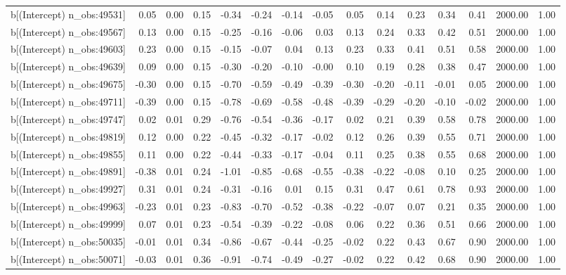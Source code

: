 \begin{table}[ht]
\begin{tabular}{rrrrrrrrrrrrrrr}
  b[(Intercept) n\_obs:49531] & 0.05 & 0.00 & 0.15 & -0.34 & -0.24 & -0.14 & -0.05 & 0.05 & 0.14 & 0.23 & 0.34 & 0.41 & 2000.00 & 1.00 \\ 
  b[(Intercept) n\_obs:49567] & 0.13 & 0.00 & 0.15 & -0.25 & -0.16 & -0.06 & 0.03 & 0.13 & 0.24 & 0.33 & 0.42 & 0.51 & 2000.00 & 1.00 \\ 
  b[(Intercept) n\_obs:49603] & 0.23 & 0.00 & 0.15 & -0.15 & -0.07 & 0.04 & 0.13 & 0.23 & 0.33 & 0.41 & 0.51 & 0.58 & 2000.00 & 1.00 \\ 
  b[(Intercept) n\_obs:49639] & 0.09 & 0.00 & 0.15 & -0.30 & -0.20 & -0.10 & -0.00 & 0.10 & 0.19 & 0.28 & 0.38 & 0.47 & 2000.00 & 1.00 \\ 
  b[(Intercept) n\_obs:49675] & -0.30 & 0.00 & 0.15 & -0.70 & -0.59 & -0.49 & -0.39 & -0.30 & -0.20 & -0.11 & -0.01 & 0.05 & 2000.00 & 1.00 \\ 
  b[(Intercept) n\_obs:49711] & -0.39 & 0.00 & 0.15 & -0.78 & -0.69 & -0.58 & -0.48 & -0.39 & -0.29 & -0.20 & -0.10 & -0.02 & 2000.00 & 1.00 \\ 
  b[(Intercept) n\_obs:49747] & 0.02 & 0.01 & 0.29 & -0.76 & -0.54 & -0.36 & -0.17 & 0.02 & 0.21 & 0.39 & 0.58 & 0.78 & 2000.00 & 1.00 \\ 
  b[(Intercept) n\_obs:49819] & 0.12 & 0.00 & 0.22 & -0.45 & -0.32 & -0.17 & -0.02 & 0.12 & 0.26 & 0.39 & 0.55 & 0.71 & 2000.00 & 1.00 \\ 
  b[(Intercept) n\_obs:49855] & 0.11 & 0.00 & 0.22 & -0.44 & -0.33 & -0.17 & -0.04 & 0.11 & 0.25 & 0.38 & 0.55 & 0.68 & 2000.00 & 1.00 \\ 
  b[(Intercept) n\_obs:49891] & -0.38 & 0.01 & 0.24 & -1.01 & -0.85 & -0.68 & -0.55 & -0.38 & -0.22 & -0.08 & 0.10 & 0.25 & 2000.00 & 1.00 \\ 
  b[(Intercept) n\_obs:49927] & 0.31 & 0.01 & 0.24 & -0.31 & -0.16 & 0.01 & 0.15 & 0.31 & 0.47 & 0.61 & 0.78 & 0.93 & 2000.00 & 1.00 \\ 
  b[(Intercept) n\_obs:49963] & -0.23 & 0.01 & 0.23 & -0.83 & -0.70 & -0.52 & -0.38 & -0.22 & -0.07 & 0.07 & 0.21 & 0.35 & 2000.00 & 1.00 \\ 
  b[(Intercept) n\_obs:49999] & 0.07 & 0.01 & 0.23 & -0.54 & -0.39 & -0.22 & -0.08 & 0.06 & 0.22 & 0.36 & 0.51 & 0.66 & 2000.00 & 1.00 \\ 
  b[(Intercept) n\_obs:50035] & -0.01 & 0.01 & 0.34 & -0.86 & -0.67 & -0.44 & -0.25 & -0.02 & 0.22 & 0.43 & 0.67 & 0.90 & 2000.00 & 1.00 \\ 
  b[(Intercept) n\_obs:50071] & -0.03 & 0.01 & 0.36 & -0.91 & -0.74 & -0.49 & -0.27 & -0.02 & 0.22 & 0.42 & 0.68 & 0.90 & 2000.00 & 1.00 \\ 

\end{tabular}
\end{table}
